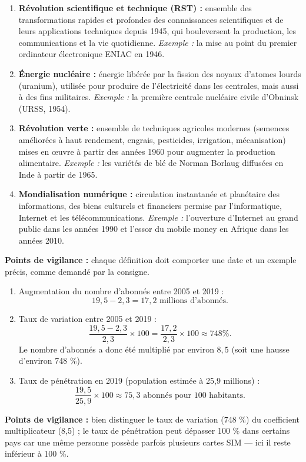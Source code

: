 \documentclass[11pt]{article}
\begin{document}
\begin{corrige}
\begin{enumerate}
\item \textbf{Révolution scientifique et technique (RST) :} ensemble des transformations rapides et profondes des connaissances scientifiques et de leurs applications techniques depuis 1945, qui bouleversent la production, les communications et la vie quotidienne. \emph{Exemple :} la mise au point du premier ordinateur électronique ENIAC en 1946.
\item \textbf{Énergie nucléaire :} énergie libérée par la fission des noyaux d'atomes lourds (uranium), utilisée pour produire de l'électricité dans les centrales, mais aussi à des fins militaires. \emph{Exemple :} la première centrale nucléaire civile d'Obninsk (URSS, 1954).
\item \textbf{Révolution verte :} ensemble de techniques agricoles modernes (semences améliorées à haut rendement, engrais, pesticides, irrigation, mécanisation) mises en œuvre à partir des années 1960 pour augmenter la production alimentaire. \emph{Exemple :} les variétés de blé de Norman Borlaug diffusées en Inde à partir de 1965.
\item \textbf{Mondialisation numérique :} circulation instantanée et planétaire des informations, des biens culturels et financiers permise par l'informatique, Internet et les télécommunications. \emph{Exemple :} l'ouverture d'Internet au grand public dans les années 1990 et l'essor du mobile money en Afrique dans les années 2010.
\end{enumerate}
\textbf{Points de vigilance :} chaque définition doit comporter une date et un exemple précis, comme demandé par la consigne.
\end{corrige}

\begin{corrige}
\begin{enumerate}
\item Augmentation du nombre d'abonnés entre 2005 et 2019 :
\[ 19,5 - 2,3 = 17,2 \text{ millions d'abonnés.} \]
\item Taux de variation entre 2005 et 2019 :
\[ \frac{19,5 - 2,3}{2,3} \times 100 = \frac{17,2}{2,3} \times 100 \approx 748 \%. \]
Le nombre d'abonnés a donc été multiplié par environ $8,5$ (soit une hausse d'environ 748 \%).
\item Taux de pénétration en 2019 (population estimée à 25,9 millions) :
\[ \frac{19,5}{25,9} \times 100 \approx 75,3 \text{ abonnés pour 100 habitants.} \]
\end{enumerate}
\textbf{Points de vigilance :} bien distinguer le taux de variation (748 \%) du coefficient multiplicateur (8,5) ; le taux de pénétration peut dépasser 100 \% dans certains pays car une même personne possède parfois plusieurs cartes SIM — ici il reste inférieur à 100 \%.
\end{corrige}
\end{document}
